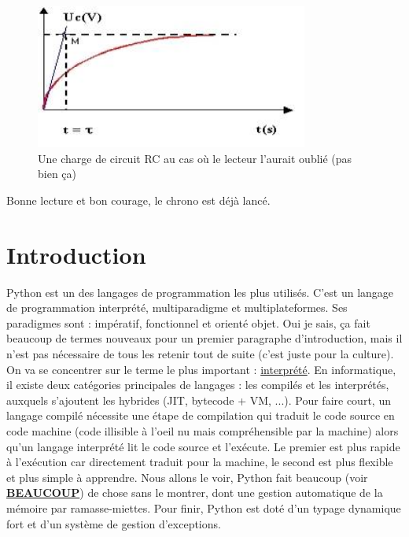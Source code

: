 \documentclass[a4paper,12pt]{article}
\begin{document}
\begin{figure}[H]
	\centering
	\includegraphics[keepaspectratio=true, width=0.8\textwidth]{../images/Charge_RC.jpg}
	\caption{Une charge de circuit RC au cas où le lecteur l'aurait oublié (pas bien ça)}
\end{figure}

\noindent Bonne lecture et bon courage, le chrono est déjà lancé.
\newpage

\tableofcontents %

\newpage

\section{Introduction}
Python est un des langages de programmation les plus utilisés.
C'est un langage de programmation interprété, multiparadigme et multiplateformes. Ses paradigmes sont : impératif, fonctionnel et orienté objet. 
Oui je sais, ça fait beaucoup de termes nouveaux pour un premier paragraphe d'introduction, mais il n'est pas nécessaire de tous les retenir tout de suite (c'est juste pour la culture).\newline
On va se concentrer sur le terme le plus important : \underline{interprété}. En informatique, il existe deux catégories principales de langages : les compilés et les interprétés, auxquels s'ajoutent les hybrides (JIT, bytecode + VM, ...). Pour faire court, un langage compilé nécessite une étape de compilation qui traduit le code source en code machine (code illisible à l'oeil nu mais compréhensible par la machine) alors qu'un langage interprété lit le code source et l'exécute. Le premier est plus rapide à l'exécution car directement traduit pour la machine, le second est plus flexible et plus simple à apprendre. Nous allons le voir, Python fait beaucoup (voir \textbf{\underline{BEAUCOUP}}) de chose sans le montrer, dont une gestion automatique de la mémoire par ramasse-miettes. Pour finir, Python est doté d'un typage dynamique fort et d'un système de gestion d'exceptions. \newline
\end{document}
